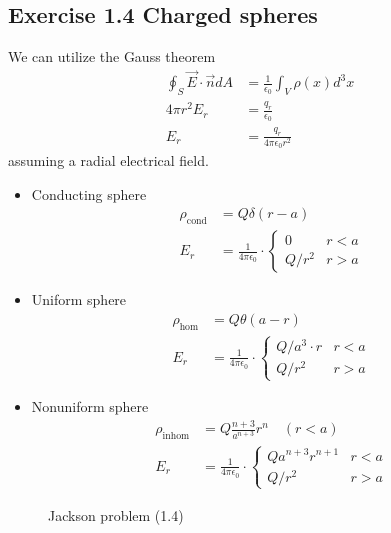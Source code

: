 \documentclass[../main.tex]{subfiles}
\begin{document}
\subsection{Exercise 1.4 Charged spheres}
We can utilize the Gauss theorem
\begin{align}
\oint_S\vec{E}\cdot\vec{n}dA&=\frac{1}{\epsilon_0}\int_V\rho(x)d^3x\\
4\pi r^2E_r&=\frac{q_r}{\epsilon_0}\\
E_r&=\frac{q_r}{4\pi\epsilon_0r^2}
\end{align}
assuming a radial electrical field.
\begin{itemize}
\item Conducting sphere
\begin{align}
\rho_\text{cond}&=Q\delta(r-a)\\
E_r&=\frac{1}{4\pi\epsilon_0}\cdot\left\{
\begin{array}{ll}
0 & r<a\\
Q/r^2 & r>a
\end{array}
\right.
\end{align}

\item Uniform sphere
\begin{align}
\rho_\text{hom}&=Q\theta(a-r)\\
E_r&=\frac{1}{4\pi\epsilon_0}\cdot\left\{
\begin{array}{ll}
Q/a^3\cdot r & r<a\\
Q/r^2 & r>a
\end{array}
\right.
\end{align}

\item Nonuniform sphere
\begin{align}
\rho_\text{inhom}&=Q\frac{n+3}{a^{n+3}}r^n\quad(r<a)\\
E_r&=\frac{1}{4\pi\epsilon_0}\cdot\left\{
\begin{array}{ll}
Qa^{n+3}r^{n+1} & r<a\\
Q/r^2 & r>a
\end{array}
\right.
\end{align}
\end{itemize}
\begin{figure}[!h]
\centering
{}
\caption{Jackson problem (1.4)}
\end{figure}
\end{document}
